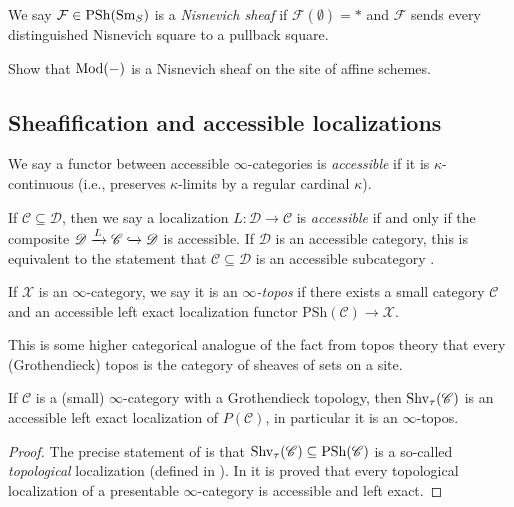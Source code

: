 \documentclass[11pt,openany]{book}
\renewcommand{\Pre}{\mathrm{PSh}}
\begin{document}
\begin{definition} We say $\mathcal{F} \in \Pre(\Sm_S)$ is a \textit{Nisnevich sheaf} if $\mathcal{F}(\emptyset)= \ast$ and $\mathcal{F}$ sends every distinguished Nisnevich square to a pullback square.
\end{definition}

\begin{exercise} Show that $\mathrm{Mod}(-)$ is a Nisnevich sheaf on the site of affine schemes.
\end{exercise}



\subsection{Sheafification and accessible localizations}

\begin{definition} \cite[5.4.2.5]{HTT} We say a functor between accessible $\infty$-categories is \textit{accessible} if it is $\kappa$-continuous (i.e., preserves $\kappa$-limits by a regular cardinal $\kappa$).
\end{definition}

\begin{definition} If $\mathscr{C} \subseteq \mathscr{D}$, then we say a localization $L \colon \mathscr{D} \to \mathscr{C}$ is \textit{accessible} if and only if the composite $\mathscr{D} \xrightarrow{L} \mathscr{C} \xhookrightarrow{} \mathscr{D}$ is accessible. If $\mathscr{D}$ is an accessible category, this is equivalent to the statement that $\mathscr{C} \subseteq \mathscr{D}$ is an accessible subcategory \cite[5.5.4.2]{HTT}.
\end{definition}

\begin{definition} \cite[6.1.0.4]{HTT} If $\mathscr{X}$ is an $\infty$-category, we say it is an $\infty$\textit{-topos} if there exists a small category $\mathscr{C}$ and an accessible left exact localization functor $\Pre(\mathscr{C}) \to \mathscr{X}$.
\end{definition}

This is some higher categorical analogue of the fact from topos theory that every (Grothendieck) topos is the category of sheaves of sets on a site.


\begin{proposition} \cite[6.2.2.7]{HTT} If $\mathscr{C}$ is a (small) $\infty$-category with a Grothendieck topology,  then $\mathrm{Shv}_\tau(\mathscr{C})$ is an accessible left exact localization of $P(\mathscr{C})$, in particular it is an $\infty$-topos.
\end{proposition}
\begin{proof} The precise statement of \cite[6.2.2.7]{HTT} is that $\Shv_\tau(\mathscr{C}) \subseteq \Pre(\mathscr{C})$ is a so-called \textit{topological} localization (defined in \cite[6.2.1.4]{HTT}). In \cite[6.2.1.6]{HTT} it is proved that every topological localization of a presentable $\infty$-category is accessible and left exact.
\end{proof}
\end{document}
